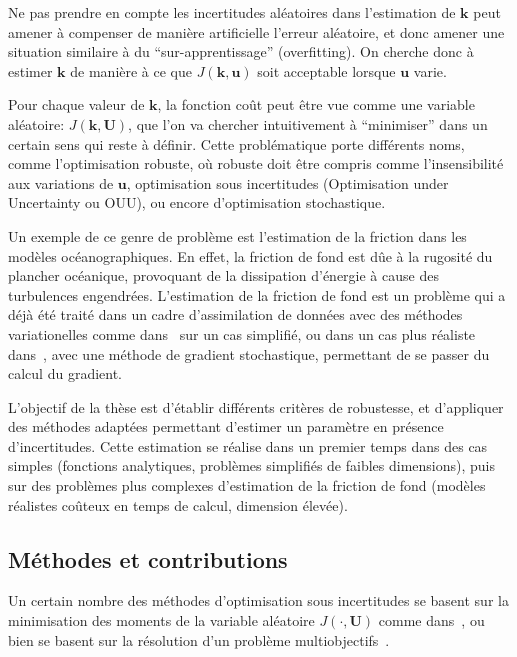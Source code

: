 \documentclass[../../Main_ManuscritThese.tex]{subfiles}
\begin{document}
Ne pas prendre en compte les incertitudes aléatoires dans l'estimation de $\mathbf{k}$ peut amener à compenser de manière artificielle l'erreur aléatoire, et donc amener une situation similaire à du ``sur-apprentissage'' (overfitting). On cherche donc à estimer $\mathbf{k}$ de manière à ce que $J(\mathbf{k}, \mathbf{u})$ soit acceptable lorsque $\mathbf{u}$ varie. 


Pour chaque valeur de $\mathbf{k}$, la fonction coût peut être vue comme une variable aléatoire: $J(\mathbf{k},\mathbf{U})$, que l'on va chercher intuitivement à ``minimiser'' dans un certain sens qui reste à définir.
Cette problématique porte différents noms, comme l'optimisation robuste, où robuste doit être compris comme l'insensibilité aux variations de $\mathbf{u}$, optimisation sous incertitudes (Optimisation under Uncertainty ou OUU), ou encore d'optimisation stochastique. 

Un exemple de ce genre de problème est l'estimation de la friction dans les modèles océanographiques. En effet, la friction de fond est dûe à la rugosité du plancher océanique, provoquant de la dissipation d'énergie à cause des turbulences engendrées. L'estimation de la friction de fond est un problème qui a déjà été traité dans un cadre d'assimilation de données avec des méthodes variationelles comme dans~\cite{das_estimation_1991,das_variational_1992} sur un cas simplifié, ou dans un cas plus réaliste dans~\cite{boutet_estimation_2015}, avec une méthode de gradient stochastique, permettant de se passer du calcul du gradient.


L'objectif de la thèse est d'établir différents critères de robustesse, et d'appliquer des méthodes adaptées permettant d'estimer un paramètre en présence d'incertitudes. Cette estimation se réalise dans un premier temps dans des cas simples (fonctions analytiques, problèmes simplifiés de faibles dimensions), puis sur des problèmes plus complexes d'estimation de la friction de fond (modèles réalistes coûteux en temps de calcul, dimension élevée).

\subsection{Méthodes et contributions}

Un certain nombre des méthodes d'optimisation sous incertitudes se basent sur la minimisation des moments de la variable aléatoire $J(\mathbf{\cdot}, \mathbf{U})$ comme dans~\cite{lehman_designing_2004,janusevskis_simultaneous_2010}, ou bien se basent sur la résolution d'un problème multiobjectifs~\cite{baudoui_optimisation_2012,ribaud_krigeage_2018}.
\end{document}
